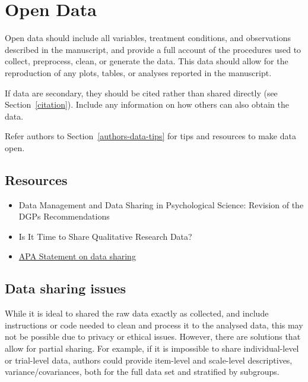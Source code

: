 \documentclass[
  oneside]{book}
\providecommand{\tightlist}{%
  \setlength{\itemsep}{0pt}\setlength{\parskip}{0pt}}
\begin{document}
\hypertarget{editors-open-data}{%
\chapter{Open Data}\label{editors-open-data}}

Open data should include all variables, treatment conditions, and observations described in the manuscript, and provide a full account of the procedures used to collect, preprocess, clean, or generate the data. This data should allow for the reproduction of any plots, tables, or analyses reported in the manuscript.

If data are secondary, they should be cited rather than shared directly (see Section~\ref{citation}). Include any information on how others can also obtain the data.

Refer authors to Section~\ref{authors-data-tips} for tips and resources to make data open.

\hypertarget{resources-3}{%
\section{Resources}\label{resources-3}}

\begin{itemize}
\tightlist
\item
  Data Management and Data Sharing in Psychological Science: Revision of the DGPs Recommendations \citep{gollwitzer_2020}
\item
  Is It Time to Share Qualitative Research Data? \citep{dubois2018time}
\item
  \href{https://www.apa.org/pubs/journals/resources/data-sharing}{APA Statement on data sharing}
\end{itemize}

\hypertarget{data-sharing-issues}{%
\section{Data sharing issues}\label{data-sharing-issues}}

While it is ideal to shared the raw data exactly as collected, and include instructions or code needed to clean and process it to the analysed data, this may not be possible due to privacy or ethical issues. However, there are solutions that allow for partial sharing. For example, if it is impossible to share individual-level or trial-level data, authors could provide item-level and scale-level descriptives, variance/covariances, both for the full data set and stratified by subgroups.
\end{document}
